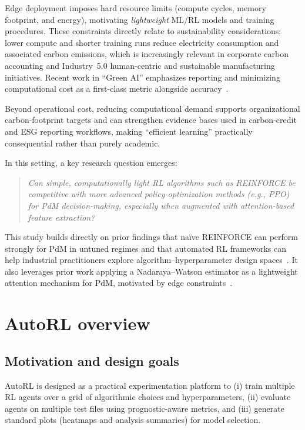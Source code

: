 \documentclass[11pt]{article}
\begin{document}
Edge deployment imposes hard resource limits (compute cycles, memory footprint, and energy), motivating \emph{lightweight} ML/RL models and training procedures. These constraints directly relate to sustainability considerations: lower compute and shorter training runs reduce electricity consumption and associated carbon emissions, which is increasingly relevant in corporate carbon accounting and Industry~5.0 human-centric and sustainable manufacturing initiatives. Recent work in ``Green AI'' emphasizes reporting and minimizing computational cost as a first-class metric alongside accuracy~\cite{Schwartz2020GreenAI, Strubell2019Energy}.

Beyond operational cost, reducing computational demand supports organizational carbon-footprint targets and can strengthen evidence bases used in carbon-credit and ESG reporting workflows, making ``efficient learning'' practically consequential rather than purely academic.

In this setting, a key research question emerges:
\begin{quote}
\emph{Can simple, computationally light RL algorithms such as \textsc{REINFORCE} be competitive with more advanced policy-optimization methods (e.g., \textsc{PPO}) for PdM decision-making, especially when augmented with attention-based feature extraction?}
\end{quote}

This study builds directly on prior findings that na\"{i}ve \textsc{REINFORCE} can perform strongly for PdM in untuned regimes and that automated RL frameworks can help industrial practitioners explore algorithm--hyperparameter design spaces~\cite{Siraskar2025NaiveREINFORCE}. It also leverages prior work applying a Nadaraya--Watson estimator as a lightweight attention mechanism for PdM, motivated by edge constraints~\cite{Siraskar2024NWAttention}.

\section{AutoRL overview}
\subsection{Motivation and design goals}
AutoRL is designed as a practical experimentation platform to (i) train multiple RL agents over a grid of algorithmic choices and hyperparameters, (ii) evaluate agents on multiple test files using prognostic-aware metrics, and (iii) generate standard plots (heatmaps and analysis summaries) for model selection.
\end{document}
